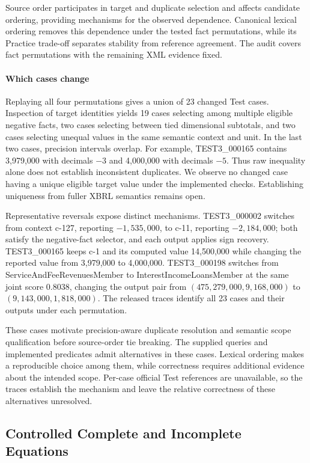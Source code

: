 \documentclass[conference]{IEEEtran}
\begin{document}
Source order participates in target and duplicate selection and affects candidate ordering, providing mechanisms for the observed dependence. Canonical lexical ordering removes this dependence under the tested fact permutations, while its Practice trade-off separates stability from reference agreement. The audit covers fact permutations with the remaining XML evidence fixed.

\paragraph{Which cases change}
Replaying all four permutations gives a union of 23 changed Test cases. Inspection of target identities yields 19 cases selecting among multiple eligible negative facts, two cases selecting between tied dimensional subtotals, and two cases selecting unequal values in the same semantic context and unit. In the last two cases, precision intervals overlap. For example, TEST3\_000165 contains 3,979,000 with decimals $-3$ and 4,000,000 with decimals $-5$. Thus raw inequality alone does not establish inconsistent duplicates. We observe no changed case having a unique eligible target value under the implemented checks. Establishing uniqueness from fuller XBRL semantics remains open.

Representative reversals expose distinct mechanisms. TEST3\_000002 switches from context c-127, reporting $-1{,}535{,}000$, to c-11, reporting $-2{,}184{,}000$; both satisfy the negative-fact selector, and each output applies sign recovery. TEST3\_000165 keeps c-1 and its computed value 14,500,000 while changing the reported value from 3,979,000 to 4,000,000. TEST3\_000198 switches from ServiceAndFeeRevenuesMember to InterestIncomeLoansMember at the same joint score 0.8038, changing the output pair from $(475{,}279{,}000,9{,}168{,}000)$ to $(9{,}143{,}000,1{,}818{,}000)$. The released traces identify all 23 cases and their outputs under each permutation.

These cases motivate precision-aware duplicate resolution and semantic scope qualification before source-order tie breaking. The supplied queries and implemented predicates admit alternatives in these cases. Lexical ordering makes a reproducible choice among them, while correctness requires additional evidence about the intended scope. Per-case official Test references are unavailable, so the traces establish the mechanism and leave the relative correctness of these alternatives unresolved.

\subsection{Controlled Complete and Incomplete Equations}
\label{sec:controlled}
\end{document}
